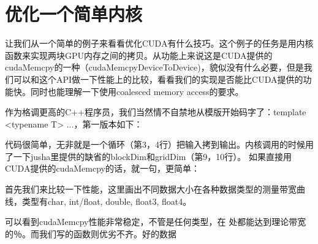 \chapter{优化一个简单内核}

让我们从一个简单的例子来看看优化CUDA有什么技巧。这个例子的任务是用内核函数来实现两块GPU内存之间的拷贝。从功能上来说这是CUDA提供的cudaMemcpy的一种（cudaMemcpyDeviceToDevice)，貌似没有什么必要，但是我们可以和这个API做一下性能上的比较，看看我们的实现是否能比CUDA提供的功能快。同时也能理解一下使用coalesced memory access的要求。

作为格调更高的C++程序员，我们当然情不自禁地从模版开始码字了：template <typename T> ...，第一版本如下：
\myvspace

代码很简单，无非就是一个循环（第3，4行）把输入拷到输出。内核调用的时候用了一下jusha里提供的缺省的blockDim和gridDim（第9，10行）。
如果直接用CUDA提供的cudaMemcpy的话，就一句，更简单：
\myvspace


首先我们来比较一下性能，这里画出不同数据大小在各种数据类型的测量带宽曲线，类型有char, int/float, double, float3, float4。

可以看到cudaMemcpy性能非常稳定，不管是任何类型，在  处都能达到理论带宽的％。而我们写的函数则优劣不齐。好的数据
